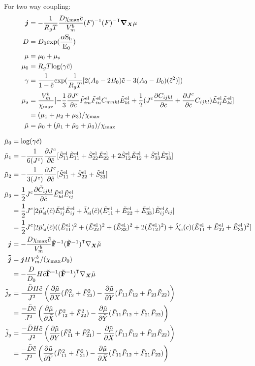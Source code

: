 \documentclass[../main.tex]{subfiles}
\begin{document}
For two way coupling:
\begin{align}
    \bm{j} &= - \fc{1}{R_g T} \fc{D\xmax \tc}{V^b_m} \inv{F} \invT{F} \nablaX \mu \\
    D &= D_0 \rm{exp}(\fc{\alpha S_h}{E_0}) \\
    \mu &= \mu_0 + \mu_s \\
    \mu_0 &= R_g T \text{log}(\gamma \td{c})\\
    \gamma &= \fc{1}{1-\td{c}}\text{exp}(\fc{1}{R_g T}[2(A_0 - 2B_0)\td{c} - 3(A_0 - B_0)(\td{c}^2)])\\
    \mu_s &= \fc{V_m^b}{\xmax}[-\fc{1}{3}\pdiff{\jc}{\tc}\tFel{im}\tFel{in}{C}_{mnkl}\tEel{kl} + \fc{1}{2}(\jc \pdiff{C_{ijkl}}{\tc} + \pdiff{\jc}{\tc} C_{ijkl})\tEel{ij}\tEel{kl}] \\ &= (\mu_1 + \mu_2 + \mu_3)/\xmax\\
    \td{\mu} &= \td{\mu}_0 + (\td{\mu}_1 + \td{\mu}_2 + \td{\mu}_3)/\xmax
\end{align}



\begin{align}
    \td{\mu}_0 &= \text{log}(\gamma \td{c}) \\
    \td{\mu}_1 &= -\fc{1}{6(\jc)}\pdiff{\jc}{\tc} [\tSel{11}\tEel{11} + \tSel{22}\tEel{22} + 2\tSel{12}\tEel{12} + \tSel{33}\tEel{33}] \\
    \td{\mu}_2 &= -\fc{1}{3(\jc)}\pdiff{ \jc}{\tc}[\tSel{11} + \tSel{22} + \tSel{33}] \\
    \td{\mu}_3 &= \fc{1}{2}\jc \pdiff{ \td{C}_{ijkl}}{\tc}\tEel{kl}\tEel{ij} \\
    &=  \fc{1}{2}\jc [2\tmusi'(\td{c})\tEel{ij}\tEel{ij} + \tlamsi'(\tc)(\tEel{11} + \tEel{22} + \tEel{33}) \tEel{ij} \delta_{ij}] \\
    &= \fc{1}{2}\jc[2\tmusi'(\td{c})((\tEel{11})^2 + (\tEel{22})^2 + (\tEel{33})^2 + 2 (\tEel{12})^2) + \tlamsi'(c)(\tEel{11} + \tEel{22} + \tEel{33})^2]\\
    \bm{j} &= - \fc{D\xmax \tc}{V^b_m} \td{\F}^{-1} (\td{\F}^{-1})^\T \nabla_{\X} \td \mu \\
    \bm{\td j} &= \bm{j}H V_m^b/(\chi_{\text{max}}D_0)\\
                &= -\fc{D}{D_0}H \tc \td{\F}^{-1}(\td{\F}^{-1})^\T \nabla_{\X} \td \mu\\
    \td{j}_x &= \fc{-\bar{D} H \tc}{J^2} \left(\pdiff{ \td \mu}{X}(\tF{12}^2 + \tF{22}^2) - \pdiff{ \td \mu}{ Y}(\tF{11}\tF{12} + \tF{21}\tF{22})\right)\\
    &= \fc{-\bar{D}  \tc}{J^2} \left(\pdiff{ \td \mu}{\tX}(\tF{12}^2 + \tF{22}^2) - \pdiff{ \td \mu}{\tY}(\tF{11}\tF{12} + \tF{21}\tF{22})\right)\\
    \td{j}_y &= \fc{-\bar{D} H \tc}{J^2} \left(\pdiff{ \td \mu}{Y}(\tF{11}^2 + \tF{21}^2) - \pdiff{ \td \mu}{X}(\tF{11}\tF{12} + \tF{21}\tF{22})\right)\\
    &= \fc{-\bar{D}  \tc}{J^2} \left( \pdiff{ \td \mu}{\tY}(\tF{11}^2 + \tF{21}^2) -\pdiff{ \td \mu}{\tX}(\tF{11}\tF{12} + \tF{21}\tF{22})\right)\\
\end{align}
\end{document}
